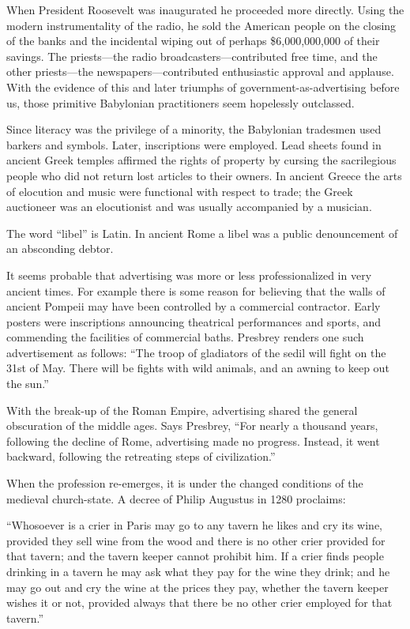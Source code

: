 \documentclass[openany,nobib]{tufte-book}
\begin{document}
When President Roosevelt was inaugurated he proceeded more directly.
Using the modern instrumentality of the radio, he sold the American
people on the closing of the banks and the incidental wiping out of
perhaps \$6,000,000,000 of their savings. The priests---the radio
broadcasters---contributed free time, and the other priests---the
newspapers---contributed enthusiastic approval and applause. With the
evidence of this and later triumphs of government-as-advertising before
us, those primitive Babylonian practitioners seem hopelessly outclassed.

Since literacy was the privilege of a minority, the Babylonian tradesmen
used barkers and symbols. Later, inscriptions were employed. Lead sheets
found in ancient Greek temples affirmed the rights of property by
cursing the sacrilegious people who did not return lost articles to
their owners. In ancient Greece the arts of elocution and music were
functional with respect to trade; the Greek auctioneer was an
elocutionist and was usually accompanied by a musician.

The word ``libel'' is Latin. In ancient Rome a libel was a public
denouncement of an absconding debtor.

It seems probable that advertising was more or less professionalized in
very ancient times. For example there is some reason for believing that
the walls of ancient Pompeii may have been controlled by a commercial
contractor. Early posters were inscriptions announcing theatrical
performances and sports, and commending the facilities of commercial
baths. Presbrey renders one such advertisement as follows: ``The troop
of gladiators of the sedil will fight on the 31st of May. There will be
fights with wild animals, and an awning to keep out the sun.''

With the break-up of the Roman Empire, advertising shared the general
obscuration of the middle ages. Says Presbrey, ``For nearly a thousand
years, following the decline of Rome, advertising made no progress.
Instead, it went backward, following the retreating steps of
civilization.''

When the profession re-emerges, it is under the changed conditions of
the medieval church-state. A decree of Philip Augustus in 1280
proclaims:

``Whosoever is a crier in Paris may go to any tavern he likes and cry
its wine, provided they sell wine from the wood and there is no other
crier provided for that tavern; and the tavern keeper cannot prohibit
him. If a crier finds people drinking in a tavern he may ask what they
pay for the wine they drink; and he may go out and cry the wine at the
prices they pay, whether the tavern keeper wishes it or not, provided
always that there be no other crier employed for that tavern.''
\end{document}
